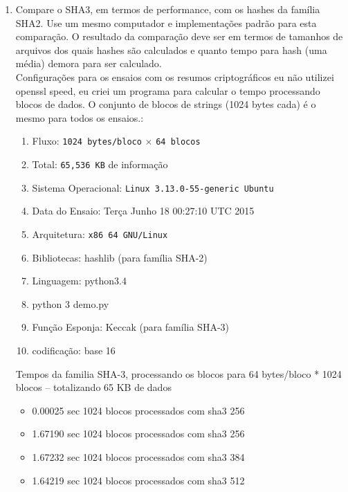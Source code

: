 \documentclass[12pt, a4paper]{article}
\begin{document}
\begin{enumerate}
\item Compare o SHA3, em termos de performance, com os hashes da família SHA2.
Use um mesmo computador e implementações padrão para esta comparação. O
resultado da comparação deve ser em termos de tamanhos de arquivos dos quais
hashes são calculados e quanto tempo para hash (uma média) demora para ser
calculado.\\

  Configurações para os ensaios com os resumos criptográficos eu não utilizei
  openssl speed, eu criei um programa para calcular o tempo processando blocos
  de dados. O conjunto de blocos de strings (1024 bytes cada) é o mesmo para
  todos os ensaios.:

  \begin{enumerate}
    \item Fluxo: \verb|1024 bytes/bloco| $\times$ \verb|64 blocos|
    \item Total: \verb|65,536 KB| de informação
    \item Sistema Operacional: \verb|Linux 3.13.0-55-generic Ubuntu|
    \item Data do Ensaio: Terça Junho 18 00:27:10 UTC 2015
    \item Arquitetura: \verb|x86 64 GNU/Linux|
    \item Bibliotecas: hashlib (para família SHA-2)
    \item Linguagem: python3.4
    \item python 3 demo.py
    \item Função Esponja: Keccak (para família SHA-3)
    \item codificação: base 16
  \end{enumerate}

  Tempos da familia SHA-3, processando os blocos para 64 bytes/bloco * 1024
  blocos -- totalizando 65 KB de dados\\

  \begin{itemize}
    \item
    0.00025 sec
    1024 blocos processados com sha3 256

    \item
    1.67190 sec
    1024 blocos processados com sha3 256

    \item
    1.67232 sec
    1024 blocos processados com sha3 384

    \item
    1.64219 sec
    1024 blocos processados com sha3 512


\end{itemize}
\end{enumerate}
\end{document}
